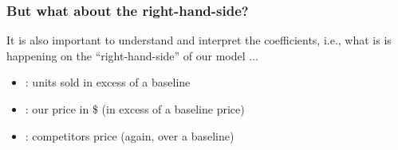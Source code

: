 \documentclass{beamer}
\newcommand{\sk}{\vspace{.5cm}}
\begin{document}
%
%
%	
%		


%
%
%
%
%
%
%
%
%
%
%

\begin{frame}
\frametitle{But what about the right-hand-side?}

It is also important to understand and interpret the coefficients, i.e., what is is happening on the ``right-hand-side'' of our model ... \sk

\begin{itemize}
\item {\color{burntorange}{\bf Sales}} : units sold in excess of a baseline
\item {\color{burntorange}{\bf P1}}: our price in \$ (in excess of a baseline price)
\item {\color{burntorange}{\bf P2}}: competitors price (again, over a baseline)
\end{itemize}



\end{frame}
\end{document}
